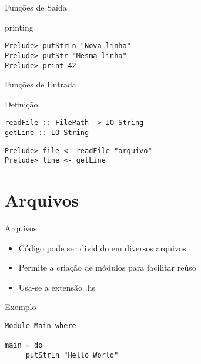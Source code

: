 \documentclass{beamer}
\begin{document}
		\begin{frame}[fragile]{Funções de Saída}
		 \begin{block}{printing}
		  \begin{lstlisting}
Prelude> putStrLn "Nova linha"
Prelude> putStr "Mesma linha"
Prelude> print 42
		  \end{lstlisting}
		 \end{block}
		\end{frame}
		
		\begin{frame}[fragile]{Funções de Entrada}

		 \begin{block}{Definição}
		  \begin{lstlisting}
readFile :: FilePath -> IO String
getLine :: IO String
		  \end{lstlisting}
		 \end{block}
		 
		 \begin{block}{}
		  \begin{lstlisting}
Prelude> file <- readFile "arquivo"
Prelude> line <- getLine
		  \end{lstlisting}
		 \end{block}		 
		\end{frame}

	\section{Arquivos}
	
	\begin{frame}{}
	\end{frame}
	
		\begin{frame}[fragile]{Arquivos}
		 \begin{itemize}
		  \item Código pode ser dividido em diversos arquivos
		  \item Permite a criação de módulos para facilitar reúso
		  \item Usa-se a extensão .hs
		 \end{itemize}
		 
		 \begin{block}{Exemplo}
		  \begin{lstlisting}
Module Main where

main = do
     putStrLn "Hello World"
		  \end{lstlisting}
		 \end{block}
		\end{frame}
		
\end{document}
